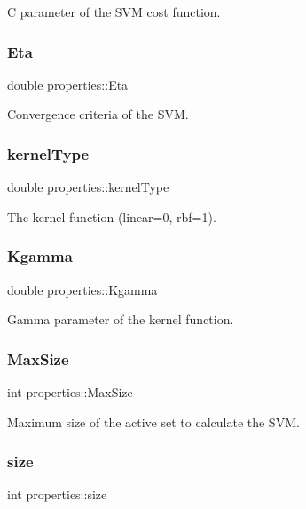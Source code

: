 C parameter of the S\+VM cost function. \hypertarget{structproperties_abd91deb543a31a6a1f75892af7cf95c8}{}\label{structproperties_abd91deb543a31a6a1f75892af7cf95c8} 
\subsubsection{\texorpdfstring{Eta}{Eta}}
{\ttfamily double properties\+::\+Eta}

Convergence criteria of the S\+VM. \hypertarget{structproperties_a498e1588ce31c3265632f17f7d65c624}{}\label{structproperties_a498e1588ce31c3265632f17f7d65c624} 
\subsubsection{\texorpdfstring{kernel\+Type}{kernelType}}
{\ttfamily double properties\+::kernel\+Type}

The kernel function (linear=0, rbf=1). \hypertarget{structproperties_aab9c0195a446f08fc782701750ddb6ac}{}\label{structproperties_aab9c0195a446f08fc782701750ddb6ac} 
\subsubsection{\texorpdfstring{Kgamma}{Kgamma}}
{\ttfamily double properties\+::\+Kgamma}

Gamma parameter of the kernel function. \hypertarget{structproperties_a42219768dd35e1ab628e1785759df400}{}\label{structproperties_a42219768dd35e1ab628e1785759df400} 
\subsubsection{\texorpdfstring{Max\+Size}{MaxSize}}
{\ttfamily int properties\+::\+Max\+Size}

Maximum size of the active set to calculate the S\+VM. \hypertarget{structproperties_a1694aebbbdd904f9b0e5faca725966b6}{}\label{structproperties_a1694aebbbdd904f9b0e5faca725966b6} 
\subsubsection{\texorpdfstring{size}{size}}
{\ttfamily int properties\+::size}

